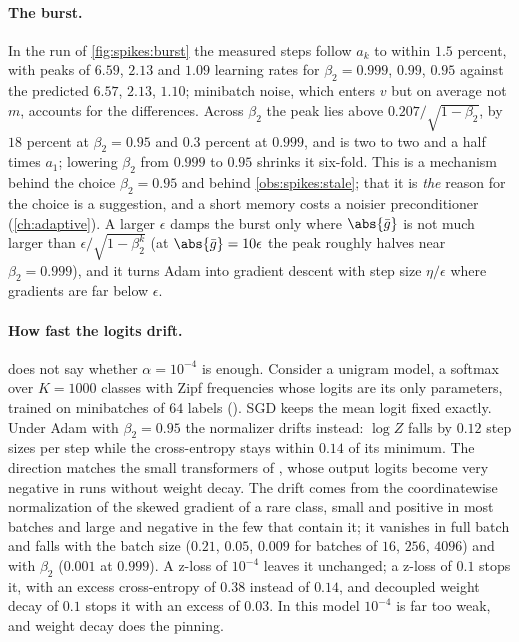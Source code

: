 \begin{refsection}
\paragraph{The burst.} In the run of \cref{fig:spikes:burst} the measured steps follow $a_k$ to within $1.5$ percent, with peaks of $6.59$, $2.13$ and $1.09$ learning rates for $\beta_2=0.999$, $0.99$, $0.95$ against the predicted $6.57$, $2.13$, $1.10$; minibatch noise, which enters $v$ but on average not $m$, accounts for the differences. Across $\beta_2$ the peak lies above $0.207/\sqrt{1-\beta_2}$, by $18$ percent at $\beta_2=0.95$ and $0.3$ percent at $0.999$, and is two to two and a half times $a_1$; lowering $\beta_2$ from $0.999$ to $0.95$ shrinks it six-fold. This is a mechanism behind the choice $\beta_2=0.95$ and behind \cref{obs:spikes:stale}; that it is \emph{the} reason for the choice is a suggestion, and a short memory costs a noisier preconditioner (\cref{ch:adaptive}). A larger $\epsilon$ damps the burst only where $\abs{\bar g}$ is not much larger than $\epsilon/\sqrt{1-\beta_2^k}$ (at $\abs{\bar g}=10\epsilon$ the peak roughly halves near $\beta_2=0.999$), and it turns Adam into gradient descent with step size $\eta/\epsilon$ where gradients are far below $\epsilon$.

\paragraph{How fast the logits drift.}  does not say whether $\alpha=10^{-4}$ is enough. Consider a unigram model, a softmax over $K=1000$ classes with Zipf frequencies whose logits are its only parameters, trained on minibatches of $64$ labels (). SGD keeps the mean logit fixed exactly. Under Adam with $\beta_2=0.95$ the normalizer drifts instead: $\log Z$ falls by $0.12$ step sizes per step while the cross-entropy stays within $0.14$ of its minimum. The direction matches the small transformers of \textcite{WortsmanEtAl2024}, whose output logits become very negative in runs without weight decay. The drift comes from the coordinatewise normalization of the skewed gradient of a rare class, small and positive in most batches and large and negative in the few that contain it; it vanishes in full batch and falls with the batch size ($0.21$, $0.05$, $0.009$ for batches of $16$, $256$, $4096$) and with $\beta_2$ ($0.001$ at $0.999$). A z-loss of $10^{-4}$ leaves it unchanged; a z-loss of $0.1$ stops it, with an excess cross-entropy of $0.38$ instead of $0.14$, and decoupled weight decay of $0.1$ stops it with an excess of $0.03$. In this model $10^{-4}$ is far too weak, and weight decay does the pinning.


\end{refsection}
